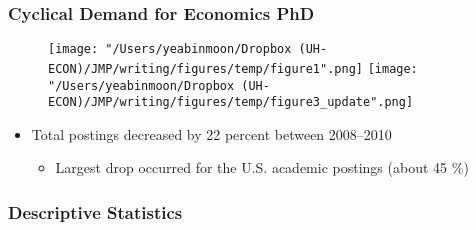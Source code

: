 \documentclass[11pt]{beamer}
\begin{document}
\begin{frame}
	\frametitle{Cyclical Demand for Economics PhD}

\begin{figure}
	\centering
\texttt{[image: "/Users/yeabinmoon/Dropbox (UH-ECON)/JMP/writing/figures/temp/figure1".png]} 
\texttt{[image: "/Users/yeabinmoon/Dropbox (UH-ECON)/JMP/writing/figures/temp/figure3\_update".png]} 
\end{figure}
			
\begin{itemize}	
\item Total postings decreased by 22 percent between 2008--2010
\begin{itemize}
	\item Largest drop occurred for the U.S. academic postings (about 45 \%)
\end{itemize}
\end{itemize}
\end{frame}



\begin{frame}
	\frametitle{Descriptive Statistics}
	
\end{frame}
\end{document}
